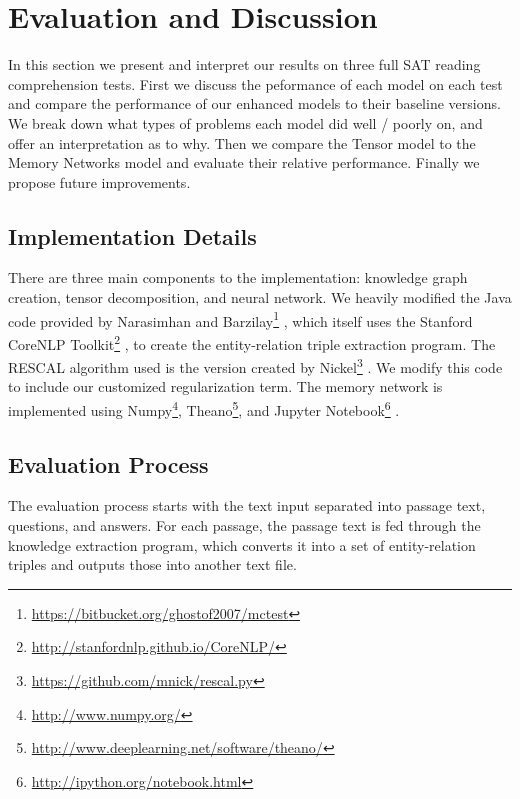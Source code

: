 \documentclass[pageno]{jpaper}
\begin{document}
\section{Evaluation and Discussion}
\label{Evaluation and Discussion}

In this section we present and interpret our results on three full SAT reading
comprehension tests. First we discuss the peformance of each model on each test
and compare the performance of our enhanced models to their baseline versions.
We break down what types of problems each model did well / poorly on, and offer
an interpretation as to why. Then we compare the Tensor model to the Memory
Networks model and evaluate their relative performance. Finally we propose
future improvements.

\subsection{Implementation Details}
\label{Implementation Details}

There are three main components to the implementation: knowledge graph creation,
tensor decomposition, and neural network. We heavily modified the Java code
provided by Narasimhan and
Barzilay\footnote{\url{https://bitbucket.org/ghostof2007/mctest}}
\cite{Narasimhan2015}, which itself uses the Stanford CoreNLP
Toolkit\footnote{\url{http://stanfordnlp.github.io/CoreNLP/}}
\cite{Manning2014}, to create the entity-relation triple extraction program. The
RESCAL algorithm used is the version created by
Nickel\footnote{\url{https://github.com/mnick/rescal.py}} \cite{Nickel2011}. We
modify this code to include our customized regularization term. The memory
network is implemented using Numpy\footnote{\url{http://www.numpy.org/}},
Theano\footnote{\url{http://www.deeplearning.net/software/theano/}}, and Jupyter
Notebook\footnote{\url{http://ipython.org/notebook.html}} \cite{Jones2001,
Perez2007, Bastien2012, Bergstra2010}.

\subsection{Evaluation Process}
\label{Evaluation Process}

The evaluation process starts with the text input separated into passage text,
questions, and answers. For each passage, the passage text is fed through the
knowledge extraction program, which converts it into a set of entity-relation
triples and outputs those into another text file.
\end{document}
